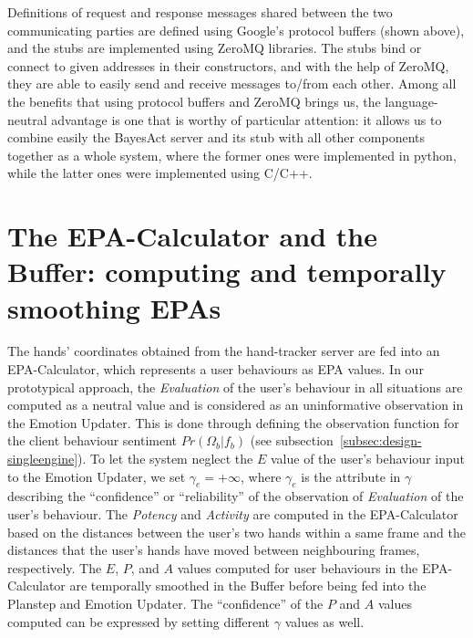 Definitions of request and response messages shared between the two communicating parties are defined using Google's protocol buffers (shown above), and the stubs are implemented using ZeroMQ libraries. The stubs bind or connect to given addresses in their constructors, and with the help of ZeroMQ, they are able to easily send and receive messages to/from each other. Among all the benefits that using protocol buffers and ZeroMQ brings us, the language-neutral advantage is one that is worthy of particular attention: it allows us to combine easily the BayesAct server and its stub with all other components together as a whole system, where the former ones were implemented in python, while the latter ones were implemented using C/C++.


\section{The EPA-Calculator and the Buffer: computing and temporally smoothing EPAs}
\label{sec:impl-epacalc}

The hands' coordinates obtained from the hand-tracker server are fed into an EPA-Calculator, which represents a user behaviours as EPA values. In our prototypical approach, the \textit{Evaluation} of the user's behaviour in all situations are computed as a neutral value and is considered as an uninformative observation in the Emotion Updater. This is done through defining the observation function for the client behaviour sentiment $Pr(\Omega_b|f_b)$ (see subsection~\ref{subsec:design-singleengine}). To let the system neglect the $E$ value of the user's behaviour input to the Emotion Updater, we set $\gamma_e = +\infty$, where $\gamma_e$ is the attribute in $\gamma$ describing the ``confidence'' or ``reliability'' of the observation of \textit{Evaluation} of the user's behaviour. The \textit{Potency} and \textit{Activity} are computed in the EPA-Calculator based on the distances between the user's two hands within a same frame and the distances that the user's hands have moved between neighbouring frames, respectively. The $E$, $P$, and $A$ values computed for user behaviours in the EPA-Calculator are temporally smoothed in the Buffer before being fed into the Planstep and Emotion Updater. The ``confidence'' of the $P$ and $A$ values computed can be expressed by setting different $\gamma$ values as well.


